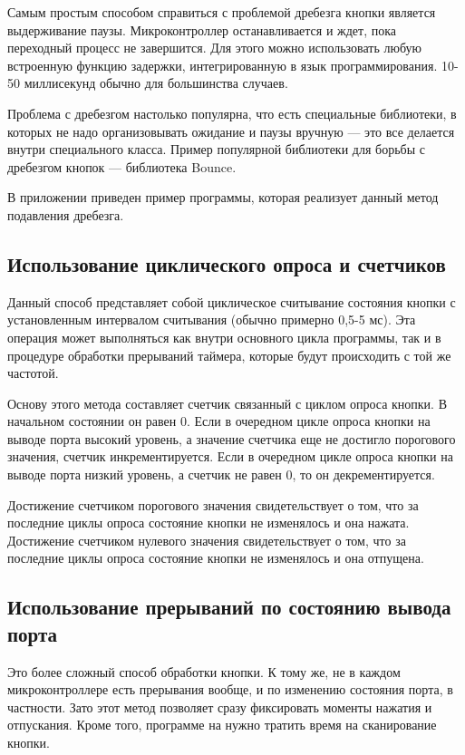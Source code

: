 \documentclass{altsu-report}
\begin{document}
Самым простым способом справиться с проблемой дребезга кнопки является выдерживание паузы. Микроконтроллер останавливается и ждет, пока переходный процесс не завершится. Для этого можно использовать любую встроенную функцию задержки, интегрированную в язык программирования. 10-50 миллисекунд обычно для большинства случаев.

Проблема с дребезгом настолько популярна, что есть специальные библиотеки, в которых не надо организовывать ожидание и паузы вручную --- это все делается внутри специального класса. Пример популярной библиотеки для борьбы с дребезгом кнопок --- библиотека Bounce.

В приложении приведен пример программы, которая реализует данный метод подавления дребезга.

\subsection{Использование циклического опроса и счетчиков}

Данный способ представляет собой циклическое считывание состояния кнопки с установленным интервалом считывания (обычно примерно 0,5-5 мс). Эта операция может выполняться как внутри основного цикла программы, так и в процедуре обработки прерываний таймера, которые будут происходить с той же частотой.

Основу этого метода составляет счетчик связанный с циклом опроса кнопки. В начальном состоянии он равен 0. Если в очередном цикле опроса кнопки на выводе порта высокий уровень, а значение счетчика еще не достигло порогового значения, счетчик инкрементируется. Если в очередном цикле опроса кнопки на выводе порта низкий уровень, а счетчик не равен 0, то он декрементируется.

Достижение счетчиком порогового значения свидетельствует о том, что за последние циклы опроса состояние кнопки не изменялось и она нажата. Достижение счетчиком нулевого значения свидетельствует о том, что за последние циклы опроса состояние кнопки не изменялось и она отпущена.

\subsection{Использование прерываний по состоянию вывода порта}

Это более сложный способ обработки кнопки. К тому же, не в каждом микроконтроллере есть прерывания вообще, и по изменению состояния порта, в частности. Зато этот метод позволяет сразу фиксировать моменты нажатия и отпускания. Кроме того, программе на нужно тратить время на сканирование кнопки.
\end{document}
